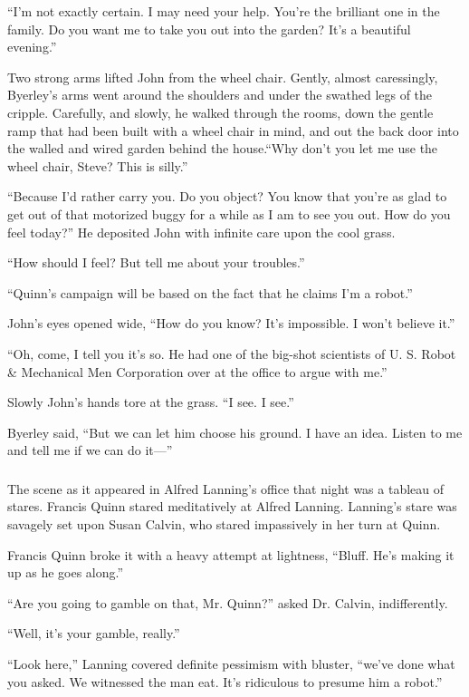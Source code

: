 \documentclass[10pt,a5paper,twoside]{book}
\begin{document}
“I’m not exactly certain. I may need your help. You’re the brilliant one in the family. Do you want me to take you out into the garden? It’s a beautiful evening.”

Two strong arms lifted John from the wheel chair. Gently, almost caressingly, Byerley’s arms went around the shoulders and under the swathed legs of the cripple. Carefully, and slowly, he walked through the rooms, down the gentle ramp that had been built with a wheel chair in mind, and out the back door into the walled and wired garden behind the house.“Why don’t you let me use the wheel chair, Steve? This is silly.”

“Because I’d rather carry you. Do you object? You know that you’re as glad to get out of that motorized buggy for a while as I am to see you out. How do you feel today?” He deposited John with infinite care upon the cool grass.

“How should I feel? But tell me about your troubles.”

“Quinn’s campaign will be based on the fact that he claims I’m a robot.”

John’s eyes opened wide, “How do you know? It’s impossible. I won’t believe it.”

“Oh, come, I tell you it’s so. He had one of the big-shot scientists of U. S. Robot \& Mechanical Men Corporation over at the office to argue with me.”

Slowly John’s hands tore at the grass. “I see. I see.”

Byerley said, “But we can let him choose his ground. I have an idea. Listen to me and tell me if we can do it—”

\subsubsection*{}
The scene as it appeared in Alfred Lanning’s office that night was a tableau of stares. Francis Quinn stared meditatively at Alfred Lanning. Lanning’s stare was savagely set upon Susan Calvin, who stared impassively in her turn at Quinn.

Francis Quinn broke it with a heavy attempt at lightness, “Bluff. He’s making it up as he goes along.”

“Are you going to gamble on that, Mr. Quinn?” asked Dr. Calvin, indifferently.

“Well, it’s your gamble, really.”

“Look here,” Lanning covered definite pessimism with bluster, “we’ve done what you asked. We witnessed the man eat. It’s ridiculous to presume him a robot.”
\end{document}
